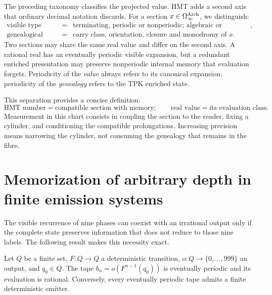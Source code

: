 The preceding taxonomy classifies the projected value. HMT adds a second
axis that ordinary decimal notation discards. For a section
\(x\in\Omega_\infty^{\rm Arch}\), we distinguish:
\[
 \begin{array}{rcl}
 \text{visible type}&=&
 \text{terminating, periodic or nonperiodic; algebraic or transcendental},\\
 \text{genealogical type}&=&
 \text{carry class, orientation, closure and monodromy of }x.
 \end{array}
\]
Two sections may share the same real value and differ on the second axis. A
rational real has an eventually periodic visible expansion, but a
redundant enriched presentation may preserve nonperiodic internal memory
that evaluation forgets. Periodicity of the \emph{value} always
refers to its canonical expansion; periodicity of the
\emph{genealogy} refers to the TPK enriched state.

This separation provides a concise definition:
\begin{equation}
 \boxed{
 \text{HMT number}
 =
 \text{compatible section with memory};
 \qquad
 \text{real value}
 =
 \text{its evaluation class}.}
 \label{eq:numero-hmt-y-valor-real}
\end{equation}
Measurement in this chart consists in coupling the section to the reader, fixing a cylinder, and
conditioning the compatible prolongations. Increasing precision means
narrowing the cylinder, not consuming the genealogy that remains in the fibre.

\section{Memorization of arbitrary depth in finite emission systems}

The visible recurrence of nine phases can coexist with an irrational
output only if the complete state preserves information that does not reduce to
those nine labels. The following result makes this necessity exact.

\begin{theorem}
\label{thm:emisor-finito-racional}
Let \(Q\) be a finite set, \(F:Q\to Q\) a deterministic transition,
\(o:Q\to\{0,\ldots,999\}\) an output, and \(q_0\in Q\). The tape
\(b_n=o(F^{n-1}(q_0))\) is eventually periodic and its evaluation is rational.
Conversely, every eventually periodic tape admits a finite deterministic
emitter.
\end{theorem}

